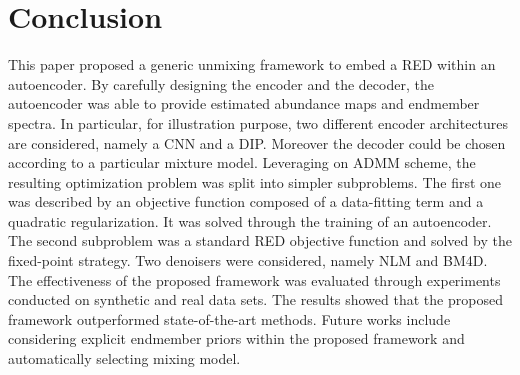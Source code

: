 \documentclass[journal,a4paper]{IEEEtran}
\begin{document}
\section{Conclusion}
\label{sec:conclusion}
This paper proposed a generic unmixing framework to embed a RED within an autoencoder. By carefully designing the encoder and the decoder, the autoencoder was able to provide estimated abundance maps and endmember spectra. In particular, for illustration purpose, two different encoder architectures are considered, namely a CNN and a DIP. Moreover the decoder could be chosen according to a particular mixture model. Leveraging on ADMM scheme, the resulting optimization problem was split into simpler subproblems. The first one was described by an objective function composed of a data-fitting term and a quadratic regularization. It was solved through the training of an autoencoder. The second subproblem was a standard RED objective function and solved by the fixed-point strategy. Two denoisers were considered, namely NLM and BM4D. The effectiveness of the proposed framework was evaluated through experiments conducted on synthetic and real data sets. The results showed that the proposed framework outperformed state-of-the-art methods. Future works include considering explicit endmember priors within the proposed framework and automatically selecting mixing model.


\ %
\end{document}
